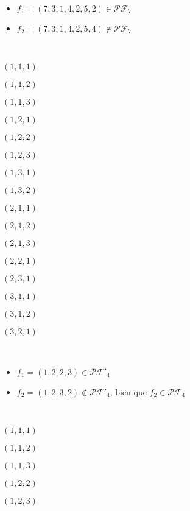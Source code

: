 \begin{example}[Définition 1 : $n = 7$]
    ~
    \begin{itemize}
        \item $f_1 = (7, 3, 1, 4, 2, 5, 2) \in \mathcal{PF}_7$
        \item $f_2 = (7, 3, 1, 4, 2, 5, 4) \notin \mathcal{PF}_7$
    \end{itemize}
\end{example}

\begin{example}[Théorème 2 : $n = 3 : pf_3 = 16$]
    ~\\
    \begin{itemize*}             
        \item $(1, 1, 1)$
        \item $(1, 1, 2)$
        \item $(1, 1, 3)$
        \item $(1, 2, 1)$
        \item $(1, 2, 2)$
        \item $(1, 2, 3)$
        \item $(1, 3, 1)$
        \item $(1, 3, 2)$
        \item $(2, 1, 1)$
        \item $(2, 1, 2)$
        \item $(2, 1, 3)$
        \item $(2, 2, 1)$
        \item $(2, 3, 1)$
        \item $(3, 1, 1)$
        \item $(3, 1, 2)$
        \item $(3, 2, 1)$
    \end{itemize*}
\end{example}

\begin{example}[Définition 3 : $n = 4$]
    ~
    \begin{itemize}
        \item $f_1 = (1, 2, 2, 3) \in \mathcal{PF'}_4$
        \item $f_2 = (1, 2, 3, 2) \notin \mathcal{PF'}_4
         \text{, bien que } f_2 \in \mathcal{PF}_4$
    \end{itemize}
\end{example}

\begin{example}[Théorème 4 : $n = 3 : pf'_3 = 5$]
    ~\\
    \begin{itemize*}
        \item $(1, 1, 1)$
        \item $(1, 1, 2)$
        \item $(1, 1, 3)$
        \item $(1, 2, 2)$
        \item $(1, 2, 3)$
    \end{itemize*}
\end{example}

